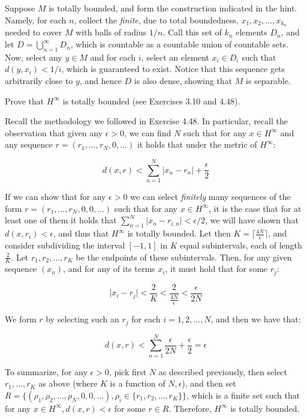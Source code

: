 \begin{solution}
    
    Suppose $M$ is totally bounded, and form the construction indicated in the hint.
    Namely, for each $n$, collect the \textit{finite}, due to total boundedness, $x_1, x_2, \ldots, x_{k_n}$ needed to cover $M$ with balls of radius $1/n$.
    Call this set of $k_n$ elements $D_n$, and let $D = \bigcup_{n=1}^{\infty} D_n$, which is countable as a countable union of countable sets.
    Now, select any $y \in M$ and for each $i$, select an element $x_i \in D_i$ such that $d(y, x_i) < 1/i$, which is guaranteed to exist.
    Notice that this sequence gets arbitrarily close to $y$, and hence $D$ is also dense, showing that $M$ is separable.
\end{solution}

\begin{exercise}{11}
    Prove that $H^{\infty}$ is totally bounded (see Exercises 3.10 and 4.48).
\end{exercise}

\begin{solution}
    
    Recall the methodology we followed in Exercise 4.48.
    In particular, recall the observation that given any $\epsilon > 0$, we can find $N$ such that for any $x \in H^{\infty}$ and any sequence $r = (r_1, \ldots, r_N, 0, \ldots)$ it holds that under the metric of $H^{\infty}$:

    \[d(x, r) < \sum_{n=1}^{N} \lvert x_n - r_n \rvert + \frac{\epsilon}{2}\]

    If we can show that for any $\epsilon > 0$ we can select \textit{finitely} many sequences of the form $r = (r_1, \ldots, r_N, 0, 0, \ldots)$ such that for any $x \in H^{\infty}$, it is the case that for at least one of them it holds that $\sum_{n=1}^{N} \lvert x_n - r_{i,n} \rvert < \epsilon/2$, we will have shown that $d(x, r_i) < \epsilon$, and thus that $H^{\infty}$ is totally bounded.
    Let then $K = \lceil \frac{4N}{\epsilon} \rceil$, and consider subdividing the interval $[-1, 1]$ in $K$ equal subintervals, each of length $\frac{2}{K}$.
    Let $r_1, r_2, \ldots, r_K$ be the endpoints of these subintervals.
    Then, for any given sequence $(x_n)$, and for any of its terms $x_i$, it must hold that for some $r_j$:

    \[\lvert x_i - r_j \rvert < \frac{2}{K} < \frac{2}{\frac{4N}{\epsilon}} < \frac{\epsilon}{2N}\]

    We form $r$ by selecting such an $r_j$ for each $i = 1, 2, \ldots, N$, and then we have that:

    \[d(x, r) < \sum_{n=1}^{N} \frac{\epsilon}{2N} + \frac{\epsilon}{2} = \epsilon\]

    To summarize, for any $\epsilon > 0$, pick first $N$ as described previously, then select $r_1, \ldots, r_K$ as above (where $K$ is a function of $N, \epsilon$), and then set $R = \{(\rho_1, \rho_2, \ldots, \rho_N, 0, 0, \ldots), \rho_i \in \{r_1, r_2, \ldots, r_K\}\}$, which is a finite set such that for any $x \in H^{\infty}, d(x, r) < \epsilon$ for some $r \in R$.
    Therefore, $H^{\infty}$ is totally bounded.
\end{solution}

